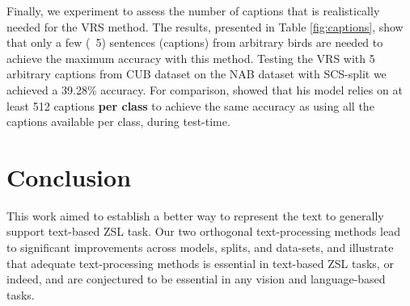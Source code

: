 \documentclass[11pt,a4paper]{article}
\newcommand\reut[1]{\textcolor{green}{\textbf{REUT:} #1 }}
\begin{document}
Finally, we experiment to assess the  number of captions that is realistically needed for the VRS method. The results, presented in Table \ref{fig:captions}, show that only a few (~5)
 sentences (captions) from arbitrary birds are needed to achieve the maximum accuracy with this method.
Testing the VRS with 5 arbitrary captions from CUB dataset on the NAB dataset with SCS-split we achieved a 39.28\% accuracy. %
For comparison, \citet{reed2016learning} showed that his model relies on at least 512 captions \textbf{per class} to achieve the same accuracy as using all the captions available per class, during test-time.




\par



\section{Conclusion}
\label{conclusion}

This work aimed to establish a better way to represent the text to generally support text-based ZSL task. Our two orthogonal text-processing methods lead to significant improvements across models, splits, and data-sets, and illustrate that adequate text-processing methods is essential  in text-based ZSL tasks, or indeed, and are conjectured to be essential in any vision and language-based tasks. 




\end{document}
